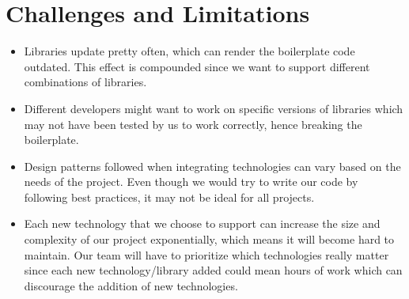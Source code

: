 \section{Challenges and Limitations}

\begin{itemize}
  \item Libraries update pretty often, which can render the boilerplate code outdated. This effect is compounded since we want to support different combinations of libraries.
  \item Different developers might want to work on specific versions of libraries which may not have been tested by us to work correctly, hence breaking the boilerplate.
  \item Design patterns followed when integrating technologies can vary based on the needs of the project. Even though we would try to write our code by following best practices, it may not be ideal for all projects.
  \item Each new technology that we choose to support can increase the size and complexity of our project exponentially, which means it will become hard to maintain. Our team will have to prioritize which technologies really matter since each new technology/library added could mean hours of work which can discourage the addition of new technologies.
\end{itemize}
